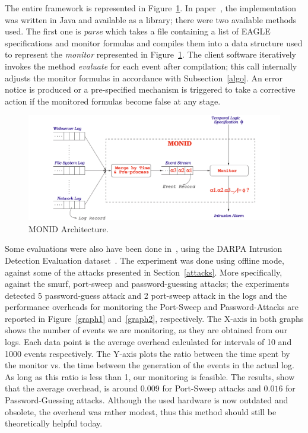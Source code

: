 \documentclass[english]{article}
\begin{document}
The entire framework is represented in Figure~\ref{monid}. In paper~\cite{naldurg2004temporal}, the implementation was written in Java and available as a library; there were two available methods used. The first one is \textit{parse} which takes a file containing a list of EAGLE specifications and monitor formulas and compiles them into a data structure used to represent the \textit{monitor} represented in Figure~\ref{monid}. The client software iteratively invokes the method \textit{evaluate} for each event after compilation; this call internally adjusts the monitor formulas in accordance with Subsection~\ref{algo}.
An error notice is produced or a pre-specified mechanism is triggered to take a corrective action if the monitored formulas become false at any stage.
\begin{figure}[]
	\centering
	\includegraphics[width=\textwidth]{images/monid.png}
	\caption{MONID Architecture.}
	\label{monid}
\end{figure}

Some evaluations were also have been done in~\cite{naldurg2004temporal}, using the DARPA Intrusion Detection Evaluation dataset~\cite{mchugh2000testing}. The experiment was done using offline mode, against some of the attacks presented in Section~\ref{attacks}. More specifically, against the smurf, port-sweep and password-guessing attacks; the experiments detected 5 password-guess attack and 2 port-sweep attack in the logs and the performance overheads for monitoring the Port-Sweep and Password-Attacks are reported in Figure~\ref{graph1} and~\ref{graph2}, respectively. The X-axis in both graphs shows the number of events we are monitoring, as they are obtained from our logs. Each data point is the average overhead calculated for intervals of 10 and 1000 events respectively. The Y-axis plots the ratio between the time spent by the monitor vs. the time between the generation of the events in the actual log. As long as this ratio is less than 1, our monitoring is feasible. The results, show that the average overhead, is around $0.009$ for Port-Sweep attacks and $0.016$ for Password-Guessing attacks.
Although the used hardware is now outdated and obsolete, the overhead was rather modest, thus this method should still be theoretically helpful today.
\end{document}
